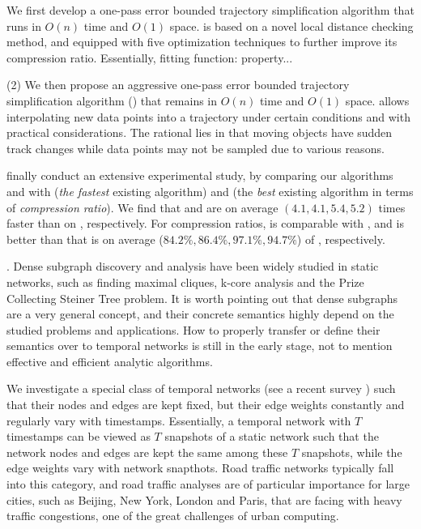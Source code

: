 We first develop a one-pass error bounded trajectory simplification algorithm that runs in $O(n)$ time and $O(1)$ space. \operb is based on a novel local distance checking method, and equipped with five optimization techniques to further improve its compression ratio. Essentially, fitting function: property...

\stab (2) We then propose an aggressive one-pass error bounded trajectory simplification algorithm (\operab) that remains in $O(n)$ time and $O(1)$ space.
\operba allows interpolating new data points into a trajectory under certain conditions and with practical considerations. The rational lies in that moving objects  have sudden track changes while data points may  not be sampled due to various reasons.

 finally conduct an extensive experimental study, by comparing our algorithms \operaa and \operab with \fbqsa (\emph{the fastest} existing \lsa algorithm) and \dpa (the {\em best} existing \lsa algorithm in terms of {\em compression ratio}). We find that \operaa and \operab are on average $(4.1, 4.1, 5.4, 5.2)$ times faster than \fbqsa on , respectively.
For compression ratios, \operaa is comparable with \dpa, and \operab is better than \dpa that is on average ($84.2\%, 86.4\%, 97.1\%, 94.7\%$) of \dpa , respectively.


. Dense subgraph discovery and analysis have been widely studied in static networks, such as  finding maximal cliques, k-core analysis and  the Prize Collecting Steiner Tree problem. It is worth pointing out that dense subgraphs are a very general concept, and their concrete semantics highly depend on the studied problems and applications. How to properly transfer or define their semantics over to temporal networks is still in the early stage, not to mention effective and efficient analytic algorithms.

We investigate a special class of temporal networks (see a recent survey \cite{tn-survey}) such that their nodes and edges are kept fixed, but their edge weights constantly and regularly vary with timestamps. Essentially, a temporal network with $T$ timestamps can be viewed as $T$ snapshots of a static network such that the network nodes and edges are kept the same among these $T$ snapshots, while the edge weights vary with network snapthots.
%
Road traffic networks typically fall into this category, and  road traffic analyses are of particular importance for large cities, such as Beijing, New York, London and Paris, that are facing with heavy traffic congestions, one of the great challenges of urban computing.

